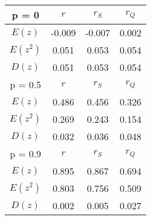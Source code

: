 \begin{tabular}{| c | c | c | c |} \hline 
 p = 0 & $r$ & $r_{S}$ & $r_{Q}$ \\ \hline 
 $E(z)$ & -0.009 & -0.007 & 0.002 \\ \hline 
 $E(z^2)$ & 0.051 & 0.053 & 0.054 \\ \hline 
 $D(z)$ & 0.051 & 0.053 & 0.054 \\ \hline 
 p = 0.5 & $r$ & $r_{S}$ & $r_{Q}$ \\ \hline 
 $E(z)$ & 0.486 & 0.456 & 0.326 \\ \hline 
 $E(z^2)$ & 0.269 & 0.243 & 0.154 \\ \hline 
 $D(z)$ & 0.032 & 0.036 & 0.048 \\ \hline 
 p = 0.9 & $r$ & $r_{S}$ & $r_{Q}$ \\ \hline 
 $E(z)$ & 0.895 & 0.867 & 0.694 \\ \hline 
 $E(z^2)$ & 0.803 & 0.756 & 0.509 \\ \hline 
 $D(z)$ & 0.002 & 0.005 & 0.027 \\ \hline 
 \end{tabular} 
